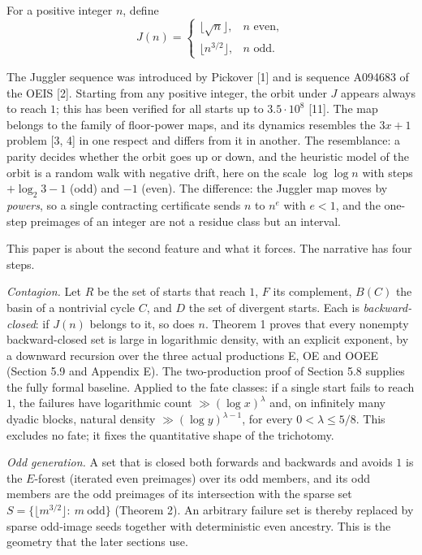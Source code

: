 \documentclass[11pt,a4paper]{article}
\begin{document}
For a positive integer \(n\), define \[
J(n)=\begin{cases}
\lfloor\sqrt n\rfloor,&n\text{ even},\\
\lfloor n^{3/2}\rfloor,&n\text{ odd}.
\end{cases}
\]

The Juggler sequence was introduced by Pickover {[}1{]} and is sequence
A094683 of the OEIS {[}2{]}. Starting from any positive integer, the
orbit under \(J\) appears always to reach \(1\); this has been verified
for all starts up to \(3.5\cdot 10^8\) {[}11{]}. The map belongs to the
family of floor-power maps, and its dynamics resembles the \(3x+1\)
problem {[}3, 4{]} in one respect and differs from it in another. The
resemblance: a parity decides whether the orbit goes up or down, and the
heuristic model of the orbit is a random walk with negative drift, here
on the scale \(\log\log n\) with steps \(+\log_2 3-1\) (odd) and \(-1\)
(even). The difference: the Juggler map moves by \emph{powers}, so a
single contracting certificate sends \(n\) to \(n^{e}\) with \(e<1\),
and the one-step preimages of an integer are not a residue class but an
interval.

This paper is about the second feature and what it forces. The narrative
has four steps.

\emph{Contagion.} Let \(R\) be the set of starts that reach \(1\), \(F\)
its complement, \(B(C)\) the basin of a nontrivial cycle \(C\), and
\(D\) the set of divergent starts. Each is \emph{backward-closed}: if
\(J(n)\) belongs to it, so does \(n\). Theorem 1 proves that every
nonempty backward-closed set is large in logarithmic density, with an
explicit exponent, by a downward recursion over the three actual
productions E, OE and OOEE (Section 5.9 and Appendix E). The
two-production proof of Section 5.8 supplies the fully formal baseline.
Applied to the fate classes: if a single start fails to reach \(1\), the
failures have logarithmic count \(\gg(\log x)^\lambda\) and, on
infinitely many dyadic blocks, natural density
\(\gg(\log y)^{\lambda-1}\), for every \(0<\lambda\le5/8\). This
excludes no fate; it fixes the quantitative shape of the trichotomy.

\emph{Odd generation.} A set that is closed both forwards and backwards
and avoids \(1\) is the \(E\)-forest (iterated even preimages) over its
odd members, and its odd members are the odd preimages of its
intersection with the sparse set \(S=\{\lfloor m^{3/2}\rfloor:\ m\
\text{odd}\}\) (Theorem 2). An arbitrary failure set is thereby replaced
by sparse odd-image seeds together with deterministic even ancestry.
This is the geometry that the later sections use.
\end{document}
